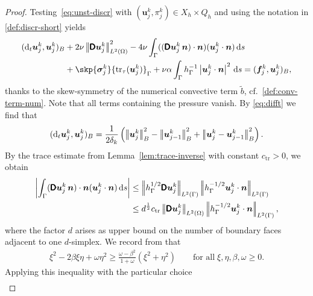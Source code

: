 \documentclass[reqno,a4paper]{amsart}
\def\abs#1{\left| #1 \right|}
\def\norm#1{\left|\!\left| #1 \right|\!\right|}
\def\tens#1{\pmb{\mathsf{#1}}}
\def\vec#1{\boldsymbol{#1}}
\def\tr{\mathop{\mathrm{tr}}\nolimits}
\def\d{{\rm d}}
\def\ds{\,\d s}
\def\difft{\d_t}
\def\Du{\BD\bu}
\def\bf{\vec{f}}
\def\bn{\vec{n}}
\def\bu{\vec{u}}
\def\bsigma{\vec{\sigma}}
\def\BD{\tens{D}}
\def\Xh{X_{h}}
\begin{document}
\begin{proof}
	
	Testing~\eqref{eq:unst-discr} with $(\bu^{k}_j,\pi_j^{k}) \in \Xh\times Q_h$ and using the notation in \eqref{def:discr-short} yields
	\begin{equation}\label{est:unst-ap-1}
		\begin{aligned}
			({\difft {\bu}^k_j},{\bu}^k_j)_B
			&+  2 \nu \norm{\Du^k_j}_{L^2(\Omega)}^2 
			- 4 \nu \int_{\Gamma} ((\Du^k_j \, \bn)\cdot \bn) (\bu^k_j \cdot \bn) \ds \\
			& 
			+ \skp{\bsigma_{j}^k
			}{\tr_{\tau}(\bu^k_j) }_{\Gamma}
			+ \nu \alpha  \int_{\Gamma}h_{\Gamma}^{-1} \abs{\bu^k_j \cdot \bn}^2 \ds = ({\bf}_j^k,{\bu}^k_j)_B,
		\end{aligned}
	\end{equation}
	thanks to the skew-symmetry of the numerical convective term $\widetilde{b}$, cf.~\eqref{def:conv-term-num}.  
	Note that all terms containing the pressure vanish. 
	By \eqref{eq:difft} we find that 
	\begin{align}\label{est:unst-ap-2}
		(\difft{\bu}^k_j,{\bu}^k_j)_B 
		= \frac{1}{2\delta_{k}} \left(\norm{{\bu}^k_j}_B^2 - \norm{{\bu}^k_{j-1}}_B^2 + \norm{{\bu}^k_j - {\bu}^k_{j-1}}_B^2 \right). 
	\end{align}
	By the trace estimate from  Lemma~\ref{lem:trace-inverse} with constant  $c_{\mathrm{tr}}>0$,  we obtain 
	\begin{equation}
		\begin{aligned}\label{est:unst-ap-3}
			\abs{\int_{\Gamma} (\Du^k_j \, \bn) \cdot \bn (\bu_j^k \cdot\bn) \ds }  
			& \leq  
			\norm{h_\Gamma^{1/2} \Du^k_j }_{L^2(\Gamma)} \norm{h_{\Gamma}^{-1/2} \bu^k_j \cdot \bn}_{L^2(\Gamma)} \\ 
			& \leq d^{\frac{1}{2}}c_{\mathrm{tr}}\norm{\Du^k_j }_{L^2(\Omega)} \norm{h_{\Gamma}^{-1/2} \bu^k_j \cdot \bn}_{L^2(\Gamma)},
		\end{aligned}
	\end{equation}
	where the factor $d$ arises as upper bound on the number of boundary faces adjacent to one $d$-simplex. We record from \cite[Ex.\ 37.2]{EG.2021.2} that 
	\begin{align}\label{eq:Tabinatora}
		\xi^{2} - 2\beta \xi\eta + \omega\eta^{2} \geq \frac{\omega-\beta^{2}}{1+\omega}(\xi^{2}+\eta^{2})\qquad\text{for all}\;\xi,\eta,\beta,\omega\geq 0. 
	\end{align}
	Applying this inequality with the particular choice
	\begin{align*}

\end{align*}
\end{proof}
\end{document}

